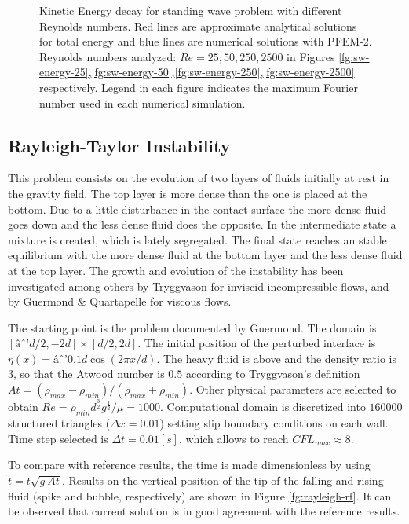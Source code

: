 \begin{figure}[h]
{    }
   \caption{Kinetic Energy decay for standing wave problem with different Reynolds numbers. Red lines are approximate analytical solutions for total energy and blue lines are numerical solutions with PFEM-2. Reynolds numbers analyzed: $Re=25,50,250,2500$ in Figures \ref{fg:sw-energy-25},\ref{fg:sw-energy-50},\ref{fg:sw-energy-250},\ref{fg:sw-energy-2500} respectively. Legend in each figure indicates the maximum Fourier number used in each numerical simulation.}
   \label{fg:sw-energy}
\end{figure}
\subsection{Rayleigh-Taylor Instability}

This problem consists on the evolution of two layers of fluids initially at rest in the gravity field. The top layer is more dense than the one is placed at the bottom. Due to a little disturbance in the contact surface the more dense fluid goes down and the less dense fluid does the opposite. In the intermediate state a mixture is created, which is lately segregated. The final state reaches an stable equilibrium with the more dense fluid at the bottom layer and the less dense fluid at the top layer. The growth and evolution of the instability has been investigated among others by Tryggvason\cite{Tryggvason88} for inviscid incompressible flows, and by Guermond
\& Quartapelle\cite{Guermond00} for viscous flows.

The starting point is the problem documented by Guermond. The domain is $[âd/2,-2d]\times[d/2,2d]$. The initial position of the perturbed interface is $\eta(x) = â0.1d \cos(2\pi x/d)$. The heavy fluid is above and the density ratio is $3$, so that the Atwood
number is $0.5$ according to Tryggvason's definition $At = (\rho_{max}-\rho_{min})/(\rho_{max}+\rho_{min})$. Other physical parameters are selected to obtain $Re=\rho_{min}d^{\frac{3}{2}}g^{\frac{1}{2}}/\mu=1000$. Computational domain is discretized into $160000$ structured triangles ($\Delta x=0.01$) setting slip boundary conditions on each wall. Time step selected is $\Delta t=0.01[s]$, which allows to reach $CFL_{max} \approx 8$.

To compare with reference results, the time is made dimensionless by using $\widetilde{t} = t\sqrt{g\ At}$. Results on the vertical position of the tip of the falling and rising fluid (spike and bubble, respectively) are shown in Figure \ref{fg:rayleigh-rf}. It can be observed that current solution is in good agreement with the reference results.

